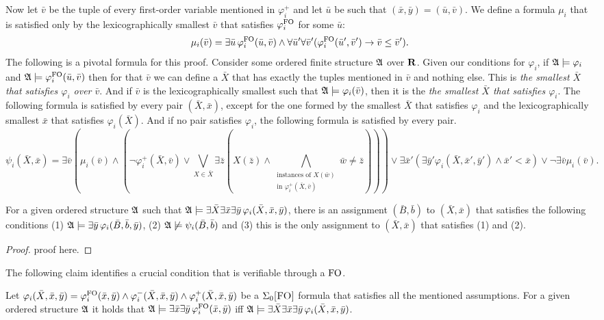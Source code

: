 Now let $\bar{v}$ be the tuple of every first-order variable mentioned in $\varphi_i^{+}$ and let $\bar{u}$ be such that $(\bar{x},\bar{y}) = (\bar{u},\bar{v})$. We define a formula $\mu_i$ that is satisfied only by the lexicographically smallest $\bar{v}$ that satisfies $\varphi_i^{{\rm FO}}$ for some $\bar{u}$:
$$
\mu_i(\bar{v}) = \exists\bar{u}\,\varphi_i^{{\rm FO}}(\bar{u},\bar{v})\wedge\forall\bar{u}'\forall\bar{v}'(\varphi_i^{{\rm FO}}(\bar{u}',\bar{v}')\to\bar{v}\leq\bar{v}').
$$
The following is a pivotal formula for this proof. Consider some ordered finite structure $\mathfrak{A}$ over $\mathbf{R}$. Given our conditions for $\varphi_i$, if $\mathfrak{A}\models\varphi_i$ and $\mathfrak{A}\models\varphi^{{\rm FO}}_i(\bar{u},\bar{v})$ then for that $\bar{v}$ we can define a $\bar{X}$ that has exactly the tuples mentioned in $\bar{v}$ and nothing else. This is {\em the smallest $\bar{X}$ that satisfies $\varphi_i$ over $\bar{v}$}. And if $\bar{v}$ is the lexicographically smallest such that $\mathfrak{A}\models\varphi_i(\bar{v})$, then it is the {\em the smallest $\bar{X}$ that satisfies $\varphi_i$}. The following formula is satisfied by every pair $(\bar{X},\bar{x})$, except for the one formed by the smallest $\bar{X}$ that satisfies $\varphi_i$ and the lexicographically smallest $\bar{x}$ that satisfies $\varphi_i(\bar{X})$. And if no pair satisfies $\varphi_i$, the following formula is satisfied by every pair.
$$
\psi_i(\bar{X},\bar{x}) = \exists\bar{v}(\mu_i(\bar{v})\wedge(\neg\varphi^{+}_i(\bar{X},\bar{v})\vee\bigvee_{X \in \bar{X}} \exists\bar{z}(X(\bar{z}) \wedge \bigwedge\limits_{\substack{\text{instances of }X(\bar{w}) \\ \text{in }\varphi^{+}_i(\bar{X},\bar{v})}}\bar{w}\neq\bar{z}))) \vee \exists\bar{x}'(\exists\bar{y}'\varphi_i(\bar{X},\bar{x}',\bar{y}')\wedge \bar{x}'<\bar{x})\vee\neg\exists\bar{v}\mu_i(\bar{v}) .
$$
\begin{claim}
For a given ordered structure $\mathfrak{A}$ such that $\mathfrak{A}\models\exists\bar{X}\exists\bar{x}\exists\bar{y}\,\varphi_i(\bar{X},\bar{x},\bar{y})$, there is an assignment $(\bar{B},\bar{b})$ to $(\bar{X},\bar{x})$ that satisfies the following conditions (1) $\mathfrak{A}\models\exists\bar{y}\,\varphi_i(\bar{B},\bar{b},\bar{y})$, (2) $\mathfrak{A}\not\models\psi_i(\bar{B},\bar{b})$ and (3) this is the only assignment to $(\bar{X},\bar{x})$ that satisfies (1) and (2).
\end{claim}
\begin{proof}
	proof here.
\end{proof}
The following claim identifies a crucial condition that is verifiable through a ${\rm FO}$. 
\begin{claim}
	Let $\varphi_i(\bar{X},\bar{x},\bar{y}) = \varphi^{{\rm FO}}_i(\bar{x},\bar{y}) \wedge \varphi^{-}_i(\bar{X},\bar{x},\bar{y}) \wedge \varphi^{+}_i(\bar{X},\bar{x},\bar{y})$ be a $\Sigma_{0}\textsc{[FO]}$ formula that satisfies all the mentioned assumptions. For a given ordered structure $\mathfrak{A}$ it holds that $\mathfrak{A}\models\exists\bar{x}\exists\bar{y}\,\varphi^{{\rm FO}}_i(\bar{x},\bar{y})$ iff $\mathfrak{A}\models\exists\bar{X}\exists\bar{x}\exists\bar{y}\,\varphi_i(\bar{X},\bar{x},\bar{y})$.
\end{claim}
